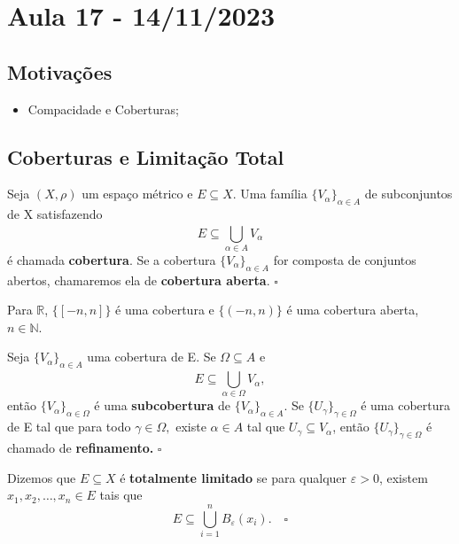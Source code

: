 \documentclass[metric_notes.tex]{subfiles}
\begin{document}
\section{Aula 17 - 14/11/2023}
\subsection{Motivações}
\begin{itemize}
	\item Compacidade e Coberturas;
\end{itemize}
\subsection{Coberturas e Limitação Total}
\begin{def*}
	Seja \((X, \rho )\) um espaço métrico e \(E\subseteq{X}.\) Uma família \(\{V_{\alpha }\}_{\alpha \in A}\) de subconjuntos de X satisfazendo
	\[
		E \subseteq \bigcup_{\alpha \in A}^{}{V_{\alpha }}
	\]
	é chamada \textbf{cobertura}. Se a cobertura \(\{V_{\alpha }\}_{\alpha \in A}\) for composta de conjuntos abertos, chamaremos ela de \textbf{cobertura aberta}. \(\square\)
\end{def*}
\begin{example}
	Para \(\mathbb{R}\), \(\{[-n, n]\}\) é uma cobertura e \(\{(-n, n)\}\) é uma cobertura aberta, \(n\in \mathbb{N}\).
\end{example}
\begin{def*}
	Seja \(\{V_{\alpha }\}_{\alpha \in A}\) uma cobertura de E. Se \(\Omega \subseteq{A}\) e
	\[
		E \subseteq{\bigcup_{\alpha \in \Omega }^{}{V_{\alpha }}},
	\]
	então \(\{V_{\alpha }\}_{\alpha \in \Omega }\) é uma \textbf{subcobertura} de \(\{V_{\alpha }\}_{\alpha \in A}.\) Se \(\{U_{\gamma }\}_{\gamma \in \Omega }\) é uma cobertura
	de E tal que para todo \(\gamma \in \Omega, \) existe \(\alpha \in A\) tal que \(U_{\gamma }\subseteq{V_{\alpha }}\), então \(\{U_{\gamma }\}_{\gamma \in\Omega }\)
	é chamado de \textbf{refinamento.} \(\square\)
\end{def*}
\begin{def*}
	Dizemos que \(E\subseteq{X}\) é \textbf{totalmente limitado} se para qualquer \(\varepsilon > 0\), existem \(x_{1}, x_{2}, \dotsc, x_{n}\in E\) tais que
	\[
		E \subseteq{\bigcup_{i=1}^{n}{B_{\varepsilon }(x_{i})}}.\quad\square
	\]
\end{def*}
\end{document}
